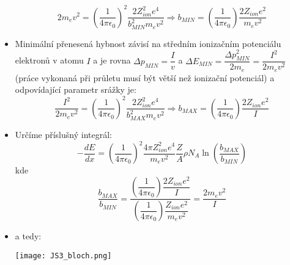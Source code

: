 \documentclass[../../main.tex]{subfiles}
\begin{document}
\begin{itemize}
	\begin{equation}
	2 m_e v^2 = \left( \dfrac{1}{4 \pi \epsilon_0} \right) ^2 \dfrac{2 Z_{ion}^2 e^4}{b_{MIN}^2 m_e v^2} \Rightarrow b_{MIN} = \left( \dfrac{1}{4 \pi \epsilon_0} \right) \dfrac{2 Z_{ion} e^2}{m_e v^2}
	\end{equation}
	\item Minimální přenesená hybnost závisí na středním ionizačním potenciálu elektronů v atomu $I$ a je rovna $\Delta p _{MIN} = \dfrac{I}{v}$ a $\Delta E_{MIN} = \dfrac{\Delta p_{MIN}^2 }{2 m_e} = \dfrac{I^2}{2 m_e v^2} $ (práce vykonaná při průletu musí být větší než ionizační potenciál) a odpovídající parametr srážky je:
	\begin{equation}
	\dfrac{I^2}{2 m_e v^2} = \left( \dfrac{1}{4 \pi \epsilon_0} \right) ^2 \dfrac{2 Z_{ion}^2 e^4}{b_{MAX}^2 m_e v^2} \Rightarrow b_{MAX} = \left( \dfrac{1}{4 \pi \epsilon_0} \right) \dfrac{2 Z_{ion} e^2}{I} 
	\end{equation}
	\item Určíme příslušný integrál: 
	\begin{equation}
	- \dfrac{dE}{dx} = \left( \dfrac{1}{4 \pi \epsilon_0} \right) ^2 \dfrac{4 \pi Z_{ion}^2 e^4}{m_e v^2} \dfrac{Z}{A} \rho N_A \ln \left( \dfrac{b_{MAX}}{b_{MIN}}\right) 
	\end{equation}
	kde
	\begin{equation}
	\dfrac{b_{MAX}}{b_{MIN}} = \dfrac{\left( \dfrac{1}{4 \pi \epsilon_0} \right) \dfrac{2 Z_{ion} e^2}{I}}{\left( \dfrac{1}{4 \pi \epsilon_0} \right) \dfrac{Z_{ion} e^2}{m_e v^2}} = \dfrac{2 m_e v^2}{I}
	\end{equation}
	\item a tedy:
	\begin{center}
		\hspace*{-1.5cm}
		\texttt{[image: JS3\_bloch.png]}
	\end{center}
\end{itemize}
\end{document}
